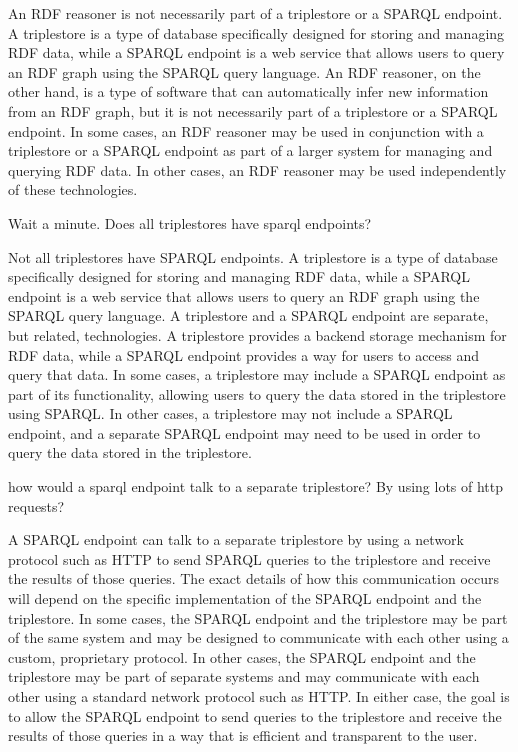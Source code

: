\begin{description}
	\gpt An RDF reasoner is not necessarily part of a triplestore or a SPARQL endpoint. A triplestore is a type of database specifically designed for storing and managing RDF data, while a SPARQL endpoint is a web service that allows users to query an RDF graph using the SPARQL query language. An RDF reasoner, on the other hand, is a type of software that can automatically infer new information from an RDF graph, but it is not necessarily part of a triplestore or a SPARQL endpoint. In some cases, an RDF reasoner may be used in conjunction with a triplestore or a SPARQL endpoint as part of a larger system for managing and querying RDF data. In other cases, an RDF reasoner may be used independently of these technologies.

	\me Wait a minute. Does all triplestores have sparql endpoints?

	\gpt Not all triplestores have SPARQL endpoints. A triplestore is a type of database specifically designed for storing and managing RDF data, while a SPARQL endpoint is a web service that allows users to query an RDF graph using the SPARQL query language. A triplestore and a SPARQL endpoint are separate, but related, technologies. A triplestore provides a backend storage mechanism for RDF data, while a SPARQL endpoint provides a way for users to access and query that data. In some cases, a triplestore may include a SPARQL endpoint as part of its functionality, allowing users to query the data stored in the triplestore using SPARQL. In other cases, a triplestore may not include a SPARQL endpoint, and a separate SPARQL endpoint may need to be used in order to query the data stored in the triplestore.

	\me how would a sparql endpoint talk to a separate triplestore? By using lots of http requests?

	\gpt A SPARQL endpoint can talk to a separate triplestore by using a network protocol such as HTTP to send SPARQL queries to the triplestore and receive the results of those queries. The exact details of how this communication occurs will depend on the specific implementation of the SPARQL endpoint and the triplestore. In some cases, the SPARQL endpoint and the triplestore may be part of the same system and may be designed to communicate with each other using a custom, proprietary protocol. In other cases, the SPARQL endpoint and the triplestore may be part of separate systems and may communicate with each other using a standard network protocol such as HTTP. In either case, the goal is to allow the SPARQL endpoint to send queries to the triplestore and receive the results of those queries in a way that is efficient and transparent to the user.


\end{description}
